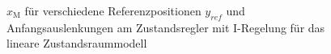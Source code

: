 \documentclass[
	pagesize,
	fontsize=12pt,
	paper=a4,
	oneside,
   reqno
]{scrartcl}
\begin{document}
\begin{figure}[H]
    \centering
    \caption[$x_{\mathrm{M}}$ für Regler mit I-Regelung (linear)]{$x_{\mathrm{M}}$ für verschiedene Referenzpositionen $y_{ref}$ und Anfangsauslenkungen am Zustandsregler mit I-Regelung für das lineare Zustandsraummodell}
    \label{fig:Bild19}
\end{figure}
\end{document}
